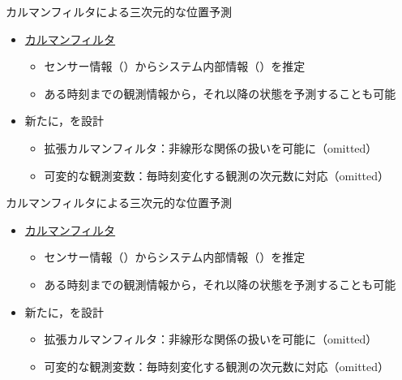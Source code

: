 \begin{frame}[noframenumbering]{カルマンフィルタによる三次元的な位置予測}
    \begin{itemize}
        \item \uline{カルマンフィルタ}
        \begin{itemize}
            \item センサー情報（）からシステム内部情報（）を推定
            \item ある時刻までの観測情報から，それ以降の状態を予測することも可能
        \end{itemize}
        \item 新たに，を設計
        \begin{itemize}
            \item 拡張カルマンフィルタ：非線形な関係の扱いを可能に（omitted）
            \item 可変的な観測変数：毎時刻変化する観測の次元数に対応（omitted）
        \end{itemize}
    \end{itemize}
\end{frame}
\begin{frame}[noframenumbering]{カルマンフィルタによる三次元的な位置予測}
    \begin{itemize}
        \item \uline{カルマンフィルタ}
        \begin{itemize}
            \item センサー情報（）からシステム内部情報（）を推定
            \item ある時刻までの観測情報から，それ以降の状態を予測することも可能
        \end{itemize}
        \item 新たに，を設計
        \begin{itemize}
            \item 拡張カルマンフィルタ：非線形な関係の扱いを可能に（omitted）
            \item 可変的な観測変数：毎時刻変化する観測の次元数に対応（omitted）
        \end{itemize}
    \end{itemize}
\end{frame}

